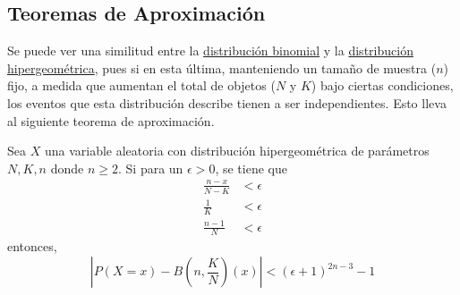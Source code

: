 \subsection{Teoremas de Aproximación}
Se puede ver una similitud entre la \hyperref[dist:binom]{distribución binomial}
y la \hyperref[dist:hip]{distribución hipergeométrica}, pues si en esta última, manteniendo
un tamaño de muestra ($n$) fijo, a medida que aumentan el total de objetos ($N$ y $K$) bajo
ciertas condiciones, los eventos que esta distribución describe tienen a ser independientes.
Esto lleva al siguiente teorema de aproximación.

\begin{Teo}
  Sea $X$ una variable aleatoria con distribución hipergeométrica de
  parámetros $N,K,n$ donde $n \geq 2$. Si para un $\epsilon>0$, se tiene que
  \begin{align*}
    \frac{n-x}{N-K} &< \epsilon\\
    \frac{1}{K}   &< \epsilon\\
    \frac{n-1}{N} &< \epsilon
  \end{align*}
  entonces,
  \[\left|P(X=x) - B\left(n,\frac{K}{N}\right)(x)\right| < (\epsilon + 1)^{2n-3} - 1\]
\end{Teo}

